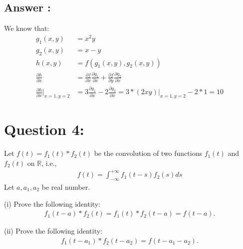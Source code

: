 \documentclass[a4paper,12pt]{article}
\newcommand{\R}{\mathbb{R}}
\begin{document}
\subsection*{Answer :}
We know that:
\begin{align*}
    g_1(x, y) &= x^2y \\
    g_2(x, y) &= x - y \\
    h(x, y) &= f(g_1(x, y), g_2(x, y)) \\
    \frac{\partial h}{\partial x} &= \frac{\partial f}{\partial x} \frac{\partial g_1}{\partial x} + \frac{\partial f}{\partial y} \frac{\partial g_2}{\partial x} \\
    \frac{\partial h}{\partial x}|_{x=1, y=2} &= 3\frac{\partial g_1}{\partial x} -2\frac{\partial g_2}{\partial x} = 3 * (2xy)|_{x=1, y=2} - 2 * 1 = 10 
\end{align*}


\section*{Question 4:}
Let \(f(t) = f_1(t) * f_2(t)\) be the convolution of two functions \(f_1(t)\) and \(f_2(t)\) on \(\R\), i.e.,
\begin{align*}
    f(t) = \int_{-\infty}^{+\infty} f_1(t - s)f_2(s)ds
\end{align*}
Let \(a, a_1, a_2\) be real number.

\vspace{1cm}
\noindent
(i) Prove the following identity:
\begin{align*}
    f_1(t-a)*f_2(t) = f_1(t) * f_2(t-a) = f(t-a).
\end{align*}

\noindent
(ii) Prove the following identity:
\begin{align*}
    f_1(t-a_1) * f_2(t-a_2) = f(t-a_1-a_2).
\end{align*}
\end{document}
